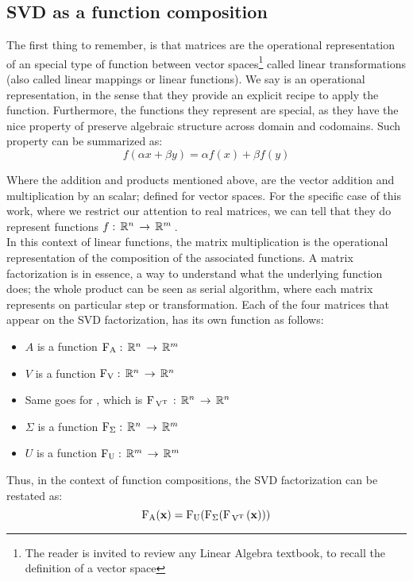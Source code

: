 \subsection{SVD as a function composition}

The first thing to remember, is that matrices are the operational
representation of an special type of function between vector
spaces\footnote{The reader is invited to review any Linear Algebra
  textbook, to recall the definition of a vector space}
called linear transformations (also called linear mappings or linear
  functions). We say is an operational representation, in the 
sense that they provide an explicit recipe to apply the
function. Furthermore, the functions they represent are
special, as they have the nice property of preserve algebraic
structure across domain and codomains. Such 
property can be summarized as: \\

\[
f(\alpha x + \beta y) = \alpha f(x) + \beta f(y)
\]
\hfill

Where the addition and products mentioned above, are the vector
addition and multiplication by an scalar; defined for vector
spaces. For the specific case of this work, where we restrict
our attention to real matrices, we can tell that they do represent
functions $f: \,\mathbb{R}^{n}\, \rightarrow \,\mathbb{R}^{m}\,$. \\

In this context of linear functions, the matrix multiplication is the
operational representation of the composition of the associated
functions. A matrix factorization is in essence, a way to understand
what the underlying function does; the whole product can be seen as
serial algorithm, where each matrix represents on particular step or
transformation. Each of the four matrices that appear on the SVD
factorization, has its own function as follows:  

\begin{itemize}
\item $A$ is a function $\operatorname{F_A}: \,\mathbb{R}^{n}\, \rightarrow \,\mathbb{R}^{m}\,$
\item $V$ is a function $\operatorname{F_V}: \,\mathbb{R}^{n}\, \rightarrow \,\mathbb{R}^{n}\,$
\item Same goes for  , which is $\operatorname{F_{\,{V}^{T}\,}}: \,\mathbb{R}^{n}\, \rightarrow \,\mathbb{R}^{n}\,$
\item $\Sigma$ is a function $\operatorname{F_\Sigma}: \,\mathbb{R}^{n}\, \rightarrow \,\mathbb{R}^{m}\,$
\item $U$ is a function $\operatorname{F_U}: \,\mathbb{R}^{m}\, \rightarrow \,\mathbb{R}^{m}\,$
\end{itemize}
\hfill

Thus, in the context of function compositions, the SVD factorization
can be restated as: \\

\[
\operatorname{F_A}(\mathbf{x}) = \operatorname{F_U}(\operatorname{F_\Sigma}(\operatorname{F_{\,{V}^{T}\,}}(\mathbf{x})))
\]
\hfill
